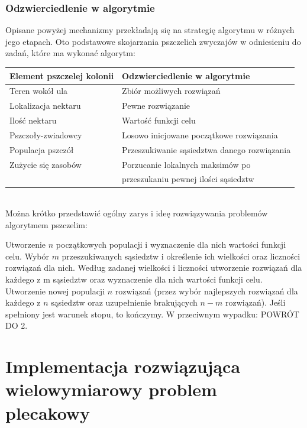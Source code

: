 \documentclass[a4paper,12pt,notitlepage]{mwrep}
\begin{document}
\subsection{Odzwierciedlenie w algorytmie}
Opisane powyżej mechanizmy przekładają się na strategię algorytmu w różnych jego etapach.
Oto podstawowe skojarzania pszczelich zwyczajów w odniesieniu do zadań, które ma wykonać algorytm:\\

\begin{tabular}{|l|l|}
\hline
Element pszczelej kolonii & Odzwierciedlenie w algorytmie \\
\hline
Teren wokół ula & Zbiór możliwych rozwiązań \\
Lokalizacja nektaru & Pewne rozwiązanie \\
Ilość nektaru & Wartość funkcji celu \\
Pszczoły-zwiadowcy & Losowo inicjowane początkowe rozwiązania \\
Populacja pszczół & Przeszukiwanie sąsiedztwa danego rozwiązania \\
Zużycie się zasobów & Porzucanie lokalnych maksimów po \\
& przeszukaniu pewnej ilości sąsiedztw \\
\hline
\end{tabular}\\

Można krótko przedstawić ogólny zarys i ideę rozwiązywania problemów algorytmem pszczelim:
\begin{enumerate}
	\fe	Utworzenie $n$ początkowych populacji i wyznaczenie dla nich wartości funkcji celu.
	\fe	Wybór $m$ przeszukiwanych sąsiedztw i określenie ich wielkości oraz liczności rozwiązań dla nich.
	\fe	Według zadanej wielkości i liczności utworzenie rozwiązań dla każdego z m sąsiedztw oraz wyznaczenie dla nich wartości funkcji celu.
	\fe	Utworzenie nowej populacji $n$ rozwiązań (przez wybór najlepszych rozwiązań dla każdego z $n$ sąsiedztw oraz uzupełnienie brakujących $n-m$ rozwiązań).
	\fe	Jeśli spełniony jest warunek stopu, to kończymy. W przeciwnym wypadku: POWRÓT DO 2.
\end{enumerate}

\chapter{Implementacja rozwiązująca wielowymiarowy problem plecakowy}
\end{document}
